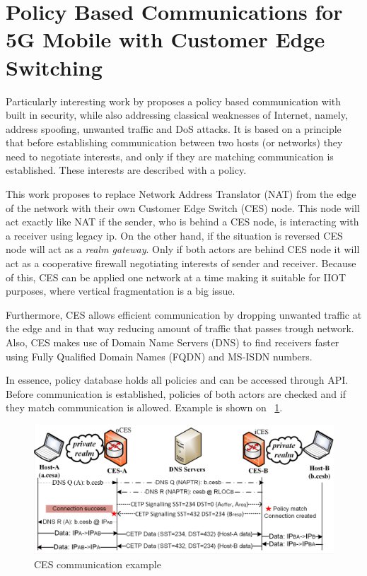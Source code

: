 \section{Policy Based Communications for 5G Mobile with Customer Edge Switching}
\label{CES}

Particularly interesting work by \cite{Kantola} proposes a policy based communication with built in security, while also addressing classical weaknesses of Internet, namely, address spoofing, unwanted traffic and DoS attacks. It is based on a principle that before establishing communication between two hosts (or networks) they need to negotiate interests, and only if they are matching communication is established. These interests are described with a policy.

This work proposes to replace Network Address Translator (NAT) from the edge of the network with their own Customer Edge Switch (CES) node. This node will act exactly like NAT if the sender, who is behind a CES node, is interacting with a receiver using legacy ip. On the other hand, if the situation is reversed CES node will act as a \emph{realm gateway}. Only if both actors are behind CES node it will act as a cooperative firewall negotiating interests of sender and receiver. Because of this, CES can be applied one network at a time making it suitable for IIOT purposes, where vertical fragmentation is a big issue.

Furthermore, CES allows efficient communication by dropping unwanted traffic at the edge and in that way reducing amount of traffic that passes trough network. Also, CES makes use of Domain Name Servers (DNS) to find receivers faster using Fully Qualified Domain Names (FQDN) and MS-ISDN numbers.

In essence, policy database holds all policies and can be accessed through API. Before communication is established, policies of both actors are checked and if they match communication is allowed. Example is shown on ~\ref{fig:PolicyBasedCommunicationExample}.

\begin{figure}[ht]
	\begin{center}
		\includegraphics[width=\textwidth]{images/PolicyBasedCommunicationExample}
		\caption{CES communication example}
		\label{fig:PolicyBasedCommunicationExample}
	\end{center}
\end{figure}
